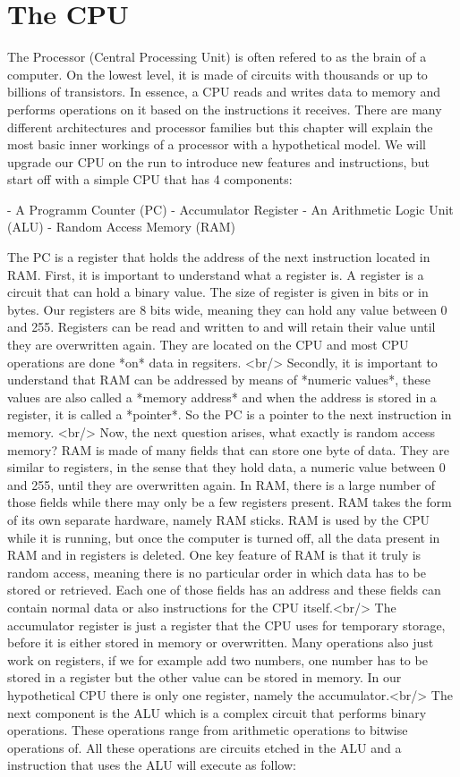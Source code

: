 \section{The CPU}

The Processor (Central Processing Unit) is often refered to as the brain of a computer. On the
lowest level, it is made of circuits with thousands or up to billions of transistors. In
essence, a CPU reads and writes data to memory and performs operations on it based on the
instructions it receives. There are many different architectures and processor families but
this chapter will explain the most basic inner workings of a processor with a hypothetical
model. We will upgrade our CPU on the run to introduce new features and instructions, but
start off with a simple CPU that has 4 components:

- A Programm Counter (PC)
- Accumulator Register
- An Arithmetic Logic Unit (ALU)
- Random Access Memory (RAM)

The PC is a register that holds the address of the next instruction located in RAM.
First, it is important to understand what a register is. A register is a circuit
that can hold a binary value. The size of register is given in bits or in bytes. Our
registers are 8 bits wide, meaning they can hold any value between 0 and 255. 
Registers can be read and written to and will retain their value until they are
overwritten again. They are located on the CPU and most CPU operations are done *on*
data in regsiters. <br/>
Secondly, it is important to understand that RAM can be addressed by means of *numeric
values*, these values are also called a *memory address* and when the address is stored
in a register, it is called a *pointer*. So the PC is a pointer to the next instruction
in memory. <br/>
Now, the next question arises, what exactly is random access memory? RAM is made of many fields 
that can store one byte of data. They are similar to registers, in the sense that they hold data, a numeric
value between 0 and 255, until they are overwritten again. In RAM, there is a large number of
those fields while there may only be a few registers present. RAM takes the form of its
own separate hardware, namely RAM sticks. RAM is used by the CPU while it is running, but
once the computer is turned off, all the data present in RAM and in registers is deleted.
One key feature of RAM is that it truly is random access, meaning there is no particular order
in which data has to be stored or retrieved. Each one of those fields has an address and
these fields can contain normal data or also instructions for the CPU itself.<br/>
The accumulator register is just a register that the CPU uses for temporary storage, before
it is either stored in memory or overwritten. Many operations also just work on registers,
if we for example add two numbers, one number has to be stored in a register but the other
value can be stored in memory. In our hypothetical CPU there is only one register, namely
the accumulator.<br/>
The next component is the ALU which is a complex circuit that performs binary operations.
These operations range from arithmetic operations to bitwise operations of. All these
operations are circuits etched in the ALU and a instruction that uses
the ALU will execute as follow:

